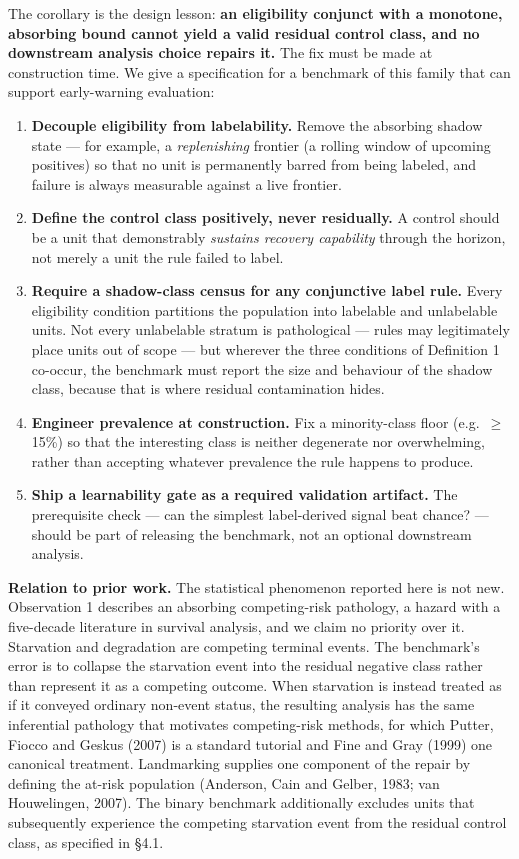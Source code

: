 \documentclass[
  11pt,
]{article}
\providecommand{\tightlist}{%
  \setlength{\itemsep}{0pt}\setlength{\parskip}{0pt}}
\begin{document}
The corollary is the design lesson: \textbf{an eligibility conjunct with
a monotone, absorbing bound cannot yield a valid residual control class,
and no downstream analysis choice repairs it.} The fix must be made at
construction time. We give a specification for a benchmark of this
family that can support early-warning evaluation:

\begin{enumerate}
\def\labelenumi{\arabic{enumi}.}
\tightlist
\item
  \textbf{Decouple eligibility from labelability.} Remove the absorbing
  shadow state --- for example, a \emph{replenishing} frontier (a
  rolling window of upcoming positives) so that no unit is permanently
  barred from being labeled, and failure is always measurable against a
  live frontier.
\item
  \textbf{Define the control class positively, never residually.} A
  control should be a unit that demonstrably \emph{sustains recovery
  capability} through the horizon, not merely a unit the rule failed to
  label.
\item
  \textbf{Require a shadow-class census for any conjunctive label rule.}
  Every eligibility condition partitions the population into labelable
  and unlabelable units. Not every unlabelable stratum is pathological
  --- rules may legitimately place units out of scope --- but wherever
  the three conditions of Definition 1 co-occur, the benchmark must
  report the size and behaviour of the shadow class, because that is
  where residual contamination hides.
\item
  \textbf{Engineer prevalence at construction.} Fix a minority-class
  floor (e.g.~\(\geq\) 15\%) so that the interesting class is neither
  degenerate nor overwhelming, rather than accepting whatever prevalence
  the rule happens to produce.
\item
  \textbf{Ship a learnability gate as a required validation artifact.}
  The prerequisite check --- can the simplest label-derived signal beat
  chance? --- should be part of releasing the benchmark, not an optional
  downstream analysis.
\end{enumerate}

\textbf{Relation to prior work.} The statistical phenomenon reported
here is not new. Observation 1 describes an absorbing competing-risk
pathology, a hazard with a five-decade literature in survival analysis,
and we claim no priority over it. Starvation and degradation are
competing terminal events. The benchmark's error is to collapse the
starvation event into the residual negative class rather than represent
it as a competing outcome. When starvation is instead treated as if it
conveyed ordinary non-event status, the resulting analysis has the same
inferential pathology that motivates competing-risk methods, for which
Putter, Fiocco and Geskus (2007) is a standard tutorial and Fine and
Gray (1999) one canonical treatment. Landmarking supplies one component
of the repair by defining the at-risk population (Anderson, Cain and
Gelber, 1983; van Houwelingen, 2007). The binary benchmark additionally
excludes units that subsequently experience the competing starvation
event from the residual control class, as specified in §4.1.
\end{document}

